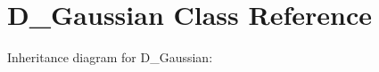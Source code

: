 \hypertarget{classD__Gaussian}{}\section{D\+\_\+\+Gaussian Class Reference}
\label{classD__Gaussian}


Inheritance diagram for D\+\_\+\+Gaussian\+:
